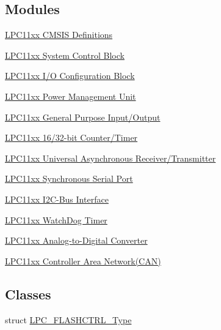 \subsection*{Modules}
\begin{DoxyCompactItemize}
\item 
\hyperlink{group___l_p_c11xx___c_m_s_i_s}{L\+P\+C11xx C\+M\+S\+I\+S Definitions}
\item 
\hyperlink{group___l_p_c11xx___s_y_s_c_o_n}{L\+P\+C11xx System Control Block}
\item 
\hyperlink{group___l_p_c11xx___i_o_c_o_n}{L\+P\+C11xx I/\+O Configuration Block}
\item 
\hyperlink{group___l_p_c11xx___p_m_u}{L\+P\+C11xx Power Management Unit}
\item 
\hyperlink{group___l_p_c11xx___g_p_i_o}{L\+P\+C11xx General Purpose Input/\+Output}
\item 
\hyperlink{group___l_p_c11xx___t_m_r}{L\+P\+C11xx 16/32-\/bit Counter/\+Timer}
\item 
\hyperlink{group___l_p_c11xx___u_a_r_t}{L\+P\+C11xx Universal Asynchronous Receiver/\+Transmitter}
\item 
\hyperlink{group___l_p_c11xx___s_s_p}{L\+P\+C11xx Synchronous Serial Port}
\item 
\hyperlink{group___l_p_c11xx___i2_c}{L\+P\+C11xx I2\+C-\/\+Bus Interface}
\item 
\hyperlink{group___l_p_c11xx___w_d_t}{L\+P\+C11xx Watch\+Dog Timer}
\item 
\hyperlink{group___l_p_c11xx___a_d_c}{L\+P\+C11xx Analog-\/to-\/\+Digital Converter}
\item 
\hyperlink{group___l_p_c11xx___c_a_n}{L\+P\+C11xx Controller Area Network(\+C\+A\+N)}
\end{DoxyCompactItemize}
\subsection*{Classes}
\begin{DoxyCompactItemize}
\item 
struct \hyperlink{struct_l_p_c___f_l_a_s_h_c_t_r_l___type}{L\+P\+C\+\_\+\+F\+L\+A\+S\+H\+C\+T\+R\+L\+\_\+\+Type}
\end{DoxyCompactItemize}
